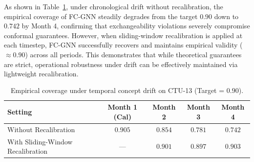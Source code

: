 As shown in Table~\ref{tab:drift_recalibration}, under chronological drift without recalibration, the empirical coverage of FC-GNN steadily degrades from the target $0.90$ down to $0.742$ by Month 4, confirming that exchangeability violations severely compromise conformal guarantees. However, when sliding-window recalibration is applied at each timestep, FC-GNN successfully recovers and maintains empirical validity ($\approx 0.90$) across all periods. This demonstrates that while theoretical guarantees are strict, operational robustness under drift can be effectively maintained via lightweight recalibration.

\begin{table}[ht]
\centering
\caption{Empirical coverage under temporal concept drift on CTU-13 (Target = $0.90$).}
\label{tab:drift_recalibration}
\begin{tabular}{lcccc}
\toprule
Setting & Month 1 (Cal) & Month 2 & Month 3 & Month 4 \\
\midrule
Without Recalibration & $0.905$ & $0.854$ & $0.781$ & $0.742$ \\
With Sliding-Window Recalibration & --- & $0.901$ & $0.897$ & $0.903$ \\
\bottomrule
\end{tabular}
\end{table}

